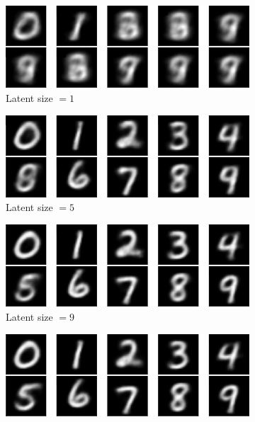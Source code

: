 \begin{figure}[h]
     \centering
     \begin{subfigure}[b]{0.47\textwidth}
         \centering
         \includegraphics[width=\textwidth]{observational/img/vae/vae_AVG_ls1.png}
         \caption{Latent size $=1$}
     \end{subfigure}
     \hfill
     \begin{subfigure}[b]{0.47\textwidth}
         \centering
         \includegraphics[width=\textwidth]{observational/img/vae/vae_AVG_ls5.png}
         \caption{Latent size $=5$}
     \end{subfigure} 
     \par\bigskip
     \begin{subfigure}[b]{0.47\textwidth}
         \centering
         \includegraphics[width=\textwidth]{observational/img/vae/vae_AVG_ls9.png}
         \caption{Latent size $=9$}
     \end{subfigure} 
     \hfill
     \begin{subfigure}[b]{0.47\textwidth}
         \centering
         \includegraphics[width=\textwidth]{observational/img/vae/vae_AVG_ls10.png}

\end{subfigure}
\end{figure}
